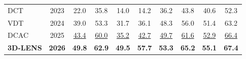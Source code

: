\documentclass[border=4pt]{standalone}
\begin{document}
\begin{tabular}{l c cccc cccc}
            DCT & 2023
            & 22.0 & 35.8 & 14.0 & 14.2
            & 36.2 & 43.8 & 40.6 & 52.3 \\

            VDT & 2024
            & 39.0 & 53.3 & 31.7 & 36.1
            & 48.3 & 56.0 & 51.4 & 63.2 \\

            DCAC & 2025
            & \underline{43.4} & \underline{60.0} & \underline{35.2} & \underline{42.7}
            & \underline{49.7} & \underline{61.6} & \underline{52.9} & \underline{66.4} \\

            \midrule

            \textbf{3D-LENS} & \textbf{2026}
            & \textbf{49.8} & \textbf{62.9} & \textbf{49.5} & \textbf{57.7}
            & \textbf{53.3} & \textbf{65.2} & \textbf{55.1} & \textbf{67.4} \\

            \bottomrule
        \end{tabular}
\end{document}
